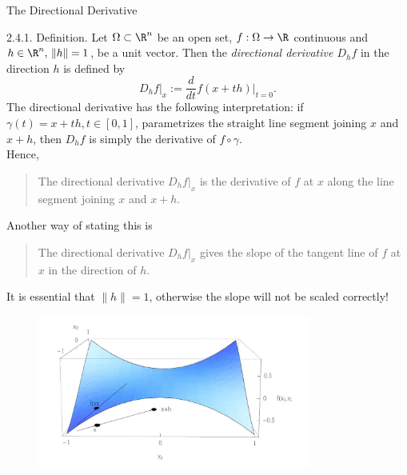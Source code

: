 \documentclass[smaller,hyperref={CJKbookmarks=true}]{beamer}
\begin{document}
\begin{frame}{The Directional Derivative}
\begin{spacing}{1}
\alert{2.4.1. Definition.} Let $\Omega\subset\R^n$ be an open set, $f:\Omega\to\R$ continuous and $h\in\R^n,\,\|h\|=1$, be a unit vector. Then the \emph{directional derivative $D_hf$} in the direction $h$ is defined by
\begin{equation}\label{2.4.2}
D_hf|_x:=\frac{d}{dt}f(x+th)\Big|_{t=0}.
\end{equation}
The directional derivative has the following interpretation: if
$\gamma(t)=x+th,t\in[0,1]$, parametrizes the straight line segment joining $x$ and $x+h$, then $D_hf$ is simply the derivative of $f\circ\gamma$.\\
Hence,
\begin{quote}
  The directional derivative $D_hf|_x$ is the derivative of $f$ at $x$ along the line segment joining $x$ and $x+h$.
\end{quote}
\vspace*{-3pt}
Another way of stating this is
\begin{quote}
  The directional derivative $D_hf|_x$ gives the slope of the tangent line of $f$ at $x$ in the direction of $h$.
\end{quote}
\newpage
It is essential that $\|h\|=1$, otherwise the slope will not be scaled correctly!
\begin{figure}
  \centering
  \includegraphics[width=0.8\textwidth]{52.jpg}


\end{figure}
\end{spacing}
\end{frame}
\end{document}
